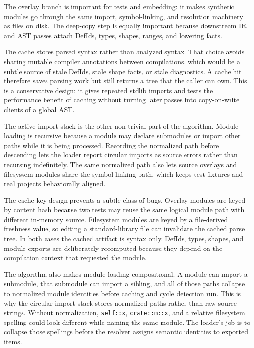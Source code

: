 The overlay branch is important for tests and embedding: it makes synthetic
modules go through the same import, symbol-linking, and resolution machinery as
files on disk. The deep-copy step is equally important because downstream IR
and AST passes attach DefIds, types, shapes, ranges, and lowering facts.

The cache stores parsed syntax rather than analyzed syntax. That choice avoids
sharing mutable compiler annotations between compilations, which would be a
subtle source of stale DefIds, stale shape facts, or stale diagnostics. A cache
hit therefore saves parsing work but still returns a tree that the caller can
own. This is a conservative design: it gives repeated stdlib imports and tests
the performance benefit of caching without turning later passes into
copy-on-write clients of a global AST.

The active import stack is the other non-trivial part of the algorithm. Module
loading is recursive because a module may declare submodules or import other
paths while it is being processed. Recording the normalized path before
descending lets the loader report circular imports as source errors rather than
recursing indefinitely. The same normalized path also lets source overlays and
filesystem modules share the symbol-linking path, which keeps test fixtures and
real projects behaviorally aligned.

The cache key design prevents a subtle class of bugs. Overlay modules are keyed
by content hash because two tests may reuse the same logical module path with
different in-memory source. Filesystem modules are keyed by a file-derived
freshness value, so editing a standard-library file can invalidate the cached
parse tree. In both cases the cached artifact is syntax only. DefIds, types,
shapes, and module exports are deliberately recomputed because they depend on
the compilation context that requested the module.

The algorithm also makes module loading compositional. A module can import a
submodule, that submodule can import a sibling, and all of those paths collapse
to normalized module identities before caching and cycle detection run. This is
why the circular-import stack stores normalized paths rather than raw source
strings. Without normalization, \texttt{self::x}, \texttt{crate::m::x}, and a
relative filesystem spelling could look different while naming the same module.
The loader's job is to collapse those spellings before the resolver assigns
semantic identities to exported items.

